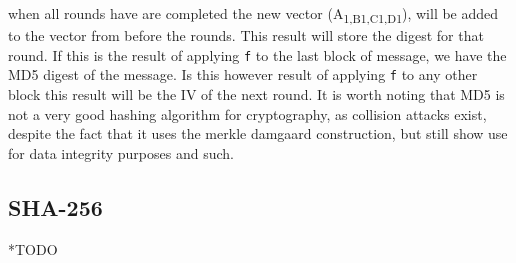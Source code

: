 \documentclass[a4paper]{article}
\begin{document}
when all rounds have are completed the new vector (A\textsubscript{1,B}\textsubscript{1,C}\textsubscript{1,D}\textsubscript{1}), will be added to the vector from before the rounds. This result will store the digest for that round. If this is the result of applying \texttt{f} to the last block of message, we have the MD5 digest of the message. Is this however result of applying \texttt{f} to any other block this result will be the IV of the next round.
It is worth noting that MD5 is not a very good hashing algorithm for cryptography, as collision attacks exist, despite the fact that it uses the merkle damgaard construction, but still show use for data integrity purposes and such.
\subsection{SHA-256}
\label{SHAalg}
*TODO
\end{document}
